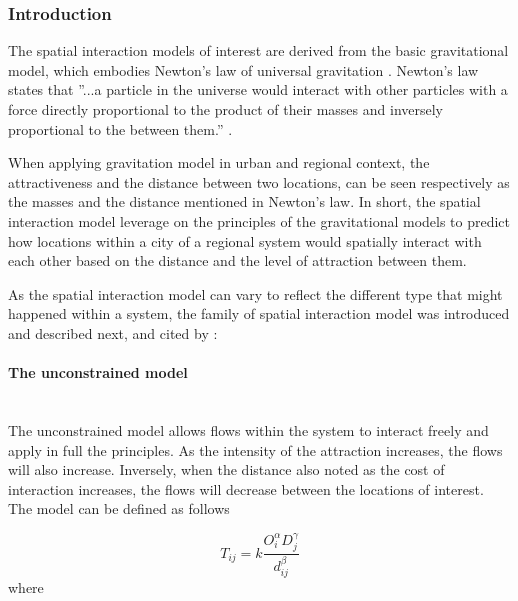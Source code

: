 \documentclass{article}
\begin{document}
\subsubsection{Introduction}

The spatial interaction models of interest are derived from the basic gravitational model, which embodies Newton's law of universal gravitation \citep{battyUrbanModellingAlgorithms1976}. Newton's law states that ''...a particle in the universe would interact with other particles with a force directly proportional to the product of their masses and inversely proportional to the between them.'' \citep{battyUrbanSimulationSpatial2023}.

When applying gravitation model in urban and regional context, the attractiveness and the distance between two locations, can be seen respectively as the masses and the distance mentioned in Newton's law. In short, the spatial interaction model leverage on the principles of the gravitational models to predict how locations within a city of a regional system would spatially interact with each other based on the distance and the level of attraction between them.

As the spatial interaction model can vary to reflect the different type that might happened within a system, the family of spatial interaction model was introduced and described next, \citep{wilsonEntropyUrbanRegional2011} and \citep{wilsonFamilySpatialInteraction1971} cited by \citep{battyUrbanModellingAlgorithms1976}:

\paragraph{The unconstrained model}\mbox{}\\

The unconstrained model allows flows within the system to interact freely and apply in full the principles. As the intensity of the attraction increases, the flows will also increase. Inversely, when the distance also noted as the cost of interaction increases, the flows will decrease between the locations of interest. The model can be defined as follows \citep{arcauteSpatialInteractionModelling2023}

\[T_{ij} = k \frac{O_i^\alpha  D_j^\gamma}{ d_{ij}^\beta}\] where 
\end{document}
